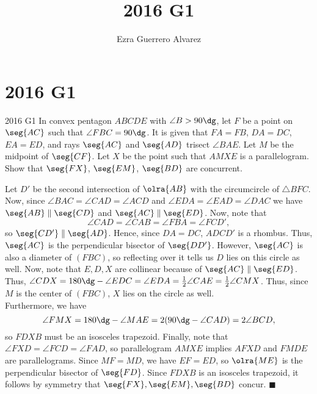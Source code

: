 \documentclass[14pt]{article}
\title{2016 G1}
\author{Ezra Guerrero Alvarez}
\begin{document}
\maketitle
	
\section*{2016 G1}

\begin{statement}{2016 G1}
	In convex pentagon $ABCDE$ with $\angle B > 90\dg$,
	let $F$ be a point on $\seg{AC}$ such that $\angle FBC = 90\dg$.
	It is given that $FA=FB$, $DA=DC$, $EA=ED$,
	and rays $\seg{AC}$ and $\seg{AD}$ trisect $\angle BAE$.
	Let $M$ be the midpoint of $\seg{CF}$.
	Let $X$ be the point such that $AMXE$ is a parallelogram.
	Show that $\seg{FX}$, $\seg{EM}$, $\seg{BD}$ are concurrent.
\end{statement}
Let $D'$ be the second intersection of $\olra{AB}$ with the circumcircle of $\triangle BFC$. Now, since $\angle BAC = \angle CAD = \angle ACD$ and $\angle EDA = \angle EAD = \angle DAC$ we have $\seg{AB}\parallel\seg{CD}$ and $\seg{AC}\parallel\seg{ED}$. Now, note that
\[ \angle CAD = \angle CAB = \angle FBA = \angle FCD', \]
so $\seg{CD'}\parallel\seg{AD}$. Hence, since $DA=DC$, $ADCD'$ is a rhombus. Thus, $\seg{AC}$ is the perpendicular bisector of $\seg{DD'}$. However, $\seg{AC}$ is also a diameter of $(FBC)$, so reflecting over it tells us $D$ lies on this circle as well. Now, note that $E,D,X$ are collinear because of $\seg{AC}\parallel\seg{ED}$. Thus, $\angle CDX=180\dg-\angle EDC=\angle EDA =\frac12\angle CAE = \frac12\angle CMX$. Thus, since $M$ is the center of $(FBC)$, $X$ lies on the circle as well. \\
Furthermore, we have
\[ \angle FMX = 180\dg-\angle MAE =2(90\dg-\angle CAD)=2\angle BCD, \]
so $FDXB$ must be an isosceles trapezoid. Finally, note that $\angle FXD = \angle FCD = \angle FAD$, so parallelogram $AMXE$ implies $AFXD$ and $FMDE$ are parallelograms. Since $MF=MD$, we have $EF=ED$, so $\olra{ME}$ is the perpendicular bisector of $\seg{FD}$. Since $FDXB$ is an isosceles trapezoid, it follows by symmetry that $\seg{FX},\seg{EM},\seg{BD}$ concur. $\blacksquare$
	
\end{document}
